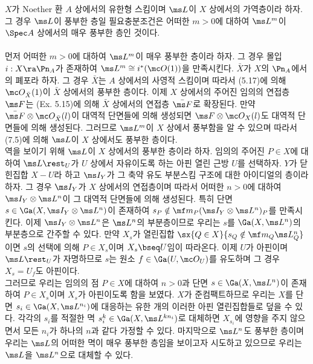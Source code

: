 	
	\begin{theorem}
	$X$가 Noether 환 $A$ 상에서의 유한형 스킴이며 $\ms L$이 $X$ 상에서의 가역층이라 하자.
	그 경우 $\ms L$이 풍부한 층일 필요충분조건은 어떠한 $m>0$에 대하여 $\ms L^m$이 $\Spec A$ 상에서의 매우 풍부한 층인 것이다.\\\\
	\pf 먼저 어떠한 $m>0$에 대하여 $\ms L^m$이 매우 풍부한 층이라 하자.
	그 경우 몰입 $i:X\ra\Pn_A$가 존재하여 $\ms L^m\cong i^*(\mc O(1))$을 만족시킨다.
	$\bar X$가 $X$의 $\Pn_A$에서의 폐포라 하자. 그 경우 $\bar X$는 $A$ 상에서의 사영적 스킴이며
	따라서 (5.17)에 의해 $\mc O_{\bar X}(1)$이 $\bar X$ 상에서의 풍부한 층이다.
	이제 $X$ 상에서의 주어진 임의의 연접층 $\ms F$는 (Ex. 5.15)에 의해 $\bar X$ 상에서의 연접층 $\bar{\ms F}$로 확장된다.
	만약 $\bar{\ms F}\otimes\mc O_{\bar X}(l)$이 대역적 단면들에 의해 생성되면
	$\ms F\otimes\mc O_X(l)$도 대역적 단면들에 의해 생성된다.
	그러므로 $\ms L^m$이 $X$ 상에서 풍부함을 알 수 있으며 따라서 (7.5)에 의해 $\ms L$이 $X$ 상에서도 풍부한 층이다.\\
	역을 보이기 위해 $\ms L$이 $X$ 상에서의 풍부한 층이라 하자. 임의의 주어진 $P\in X$에 대하여
	$\ms L\rest_U$가 $U$ 상에서 자유이도록 하는 아핀 열린 근방 $U$를 선택하자.
	$Y$가 닫힌집합 $X-U$라 하고 $\ms I_Y$가 그 축약 유도 부분스킴 구조에 대한 아이디얼의 층이라 하자.
	그 경우 $\ms I_Y$가 $X$ 상에서의 연접층이며
	따라서 어떠한 $n>0$에 대하여 $\ms I_Y\otimes\ms L^n$이 그 대역적 단면들에 의해 생성된다.
	특히 단면 $s\in\Ga(X,\ms I_Y\otimes\ms L^n)$이 존재하여 $s_P\notin\mf m_P(\ms I_Y\otimes\ms L^n)_P$를 만족시킨다.
	이제 $\ms I_Y\otimes\ms L^n$은 $\ms L^n$의 부분층이므로 우리는 $s$를 $\Ga(X,\ms L^n)$의 부분층으로 간주할 수 있다.
	만약 $X_s$가 열린집합 $\sx{Q\in X}{s_Q\notin\mf m_Q\ms L^n_Q}$이면 $s$의 선택에 의해 $P\in X_s$이며 $X_s\bseq U$임이 따라온다.
	이제 $U$가 아핀이며 $\ms L\rest_U$가 자명하므로 $s$는 원소 $f\in\Ga(U,\mc O_U)$를 유도하며 그 경우 $X_s=U_f$도 아핀이다.\\
	그러므로 우리는 임의의 점 $P\in X$에 대하여 $n>0$과 단면 $s\in\Ga(X,\ms L^n)$이 존재하여
	$P\in X_s$이며 $X_s$가 아핀이도록 함을 보였다.
	$X$가 준컴팩트하므로 우리는 $X$를 단면 $s_i\in\Ga(X,\ms L^{n_i})$에 대응하는 유한 개의 이러한 아핀 열린집합들로 덮을 수 있다.
	각각의 $s_i$를 적절한 멱 $s_i^k\in\Ga(X,\ms L^{kn_i})$로 대체하면 $X_{s_i}$에 영향을 주지 않으면서
	모든 $n_i$가 하나의 $n$과 같다 가정할 수 있다.
	마지막으로 $\ms L^n$도 풍부한 층이며 우리는 $\ms L$의 어떠한 멱이 매우 풍부한 층임을 보이고자 시도하고 있으므로
	우리는 $\ms L$을 $\ms L^n$으로 대체할 수 있다.

\end{theorem}
